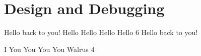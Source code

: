 \chapter{Design and Debugging}

\begin{exercises}

\begin{ex}
\begin{example}
Hello back to you!
Hello
Hello
Hello
Hello
6
Hello back to you!
\end{example}
\end{ex}

\begin{ex}
\begin{example}
I
You
You
You
You
Walrus
4
\end{example}
\end{ex}

\end{exercises}
